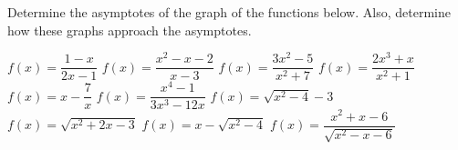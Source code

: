 \ifcalculus\pagebreak\fi
\begin{Exercise} Determine the asymptotes of the graph of the functions below. Also, determine how these graphs approach the asymptotes. 
\begin{multicols}{2}
		\Question[difficulty = 1] $f(x)=\dfrac{1-x}{2x-1}$
		\Question[difficulty = 1] $f(x)=\dfrac{x^2-x-2}{x-3}$
		\Question[difficulty = 1] $f(x)=\dfrac{3x^2-5}{x^2+7}$
		\Question[difficulty = 1] $f(x)=\dfrac{2x^3+x}{x^2+1}$
		\Question[difficulty = 1] $f(x)=x-\dfrac{7}{x}$
		\Question[difficulty = 1] $f(x)=\dfrac{x^4-1}{3x^3-12x}$
		\Question[difficulty = 2] $f(x)=\sqrt{x^2-4}-3$
		\ifanalysis\Question[difficulty = 1]\fi\ifcalculus\Question[difficulty = 2]\fi $f(x)=\sqrt{x^2+2x-3}$ 
		\Question[difficulty = 2] $f(x)=x-\sqrt{x^2-4}$
		\Question[difficulty = 3] $f(x)=\dfrac{x^2+x-6}{\sqrt{x^2-x-6}}$
		\EndCurrentQuestion
\end{multicols}

\end{Exercise}

